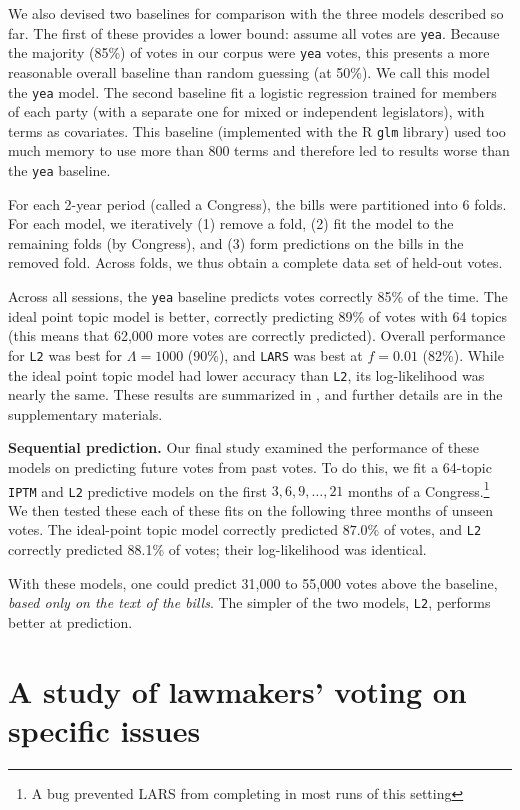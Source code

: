 We also devised two baselines for comparison with the three models
described so far.  The first of these provides a lower bound: assume
all votes are \verb!yea!.  Because the majority (85\%) of votes in our
corpus were \verb!yea! votes, this presents a more reasonable overall
baseline than random guessing (at 50\%).  We call this model the
\verb!yea!  model.  The second baseline fit a logistic regression
trained for members of each party (with a separate one for mixed or
independent legislators), with terms as covariates.  This baseline
(implemented with the R \verb!glm! library) used too much memory to
use more than 800 terms and therefore led to results worse than the
\verb!yea!  baseline.

For each 2-year period (called a Congress), the bills were partitioned
into 6 folds.  For each model, we iteratively (1) remove a fold, (2)
fit the model to the remaining folds (by Congress), and (3) form
predictions on the bills in the removed fold.  Across folds, we thus
obtain a complete data set of held-out votes.

Across all sessions, the \verb!yea! baseline predicts votes correctly
85\% of the time.  The ideal point topic model is better, correctly
predicting 89\% of votes with 64 topics (this means that 62,000 more
votes are correctly predicted).  Overall performance for \verb!L2! was
best for $\Lambda=1000$ (90\%), and \verb!LARS! was best at $f=0.01$
(82\%).  While the ideal point topic model had lower accuracy than
\verb!L2!, its log-likelihood was nearly the same.  These results are
summarized in , and further details are in the
supplementary materials.

\textbf{Sequential prediction.}  Our final study examined the
performance of these models on predicting future votes from past
votes.  To do this, we fit a 64-topic \verb!IPTM! and \verb!L2!
predictive models on the first $3, 6, 9, \ldots, 21$ months of a
Congress.\footnote{A bug prevented LARS from completing in most runs of
this setting}  We then tested these each of these fits on the
following three months of unseen votes.  The ideal-point topic model
correctly predicted $87.0\%$ of votes, and \verb!L2!  correctly
predicted 88.1\% of votes; their log-likelihood was identical.

With these models, one could predict 31,000 to 55,000 votes
above the baseline, \emph{based only on the text of the bills}.  The
simpler of the two models, \verb!L2!, performs better at prediction.

\section{A study of lawmakers' voting on specific issues}

